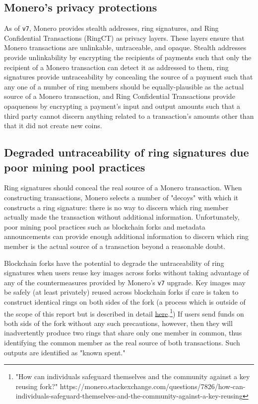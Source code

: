\documentclass[notitlepage]{report}
\begin{document}
\subsection{Monero's privacy protections}

As of \verb/v7/, Monero provides stealth addresses, ring signatures, and Ring Confidential Transactions (RingCT) as privacy layers.  These layers ensure that Monero transactions are unlinkable, untraceable, and opaque.  Stealth addresses provide unlinkability by encrypting the recipients of payments such that only the recipient of a Monero transaction can detect it as addressed to them, ring signatures provide untraceability by concealing the source of a payment such that any one of a number of ring members should be equally-plausible as the actual source of a Monero transaction, and Ring Confidential Transactions provide opaqueness by encrypting a payment's input and output amounts such that a third party cannot discern anything related to a transaction's amounts other than that it did not create new coins.

\subsection{Degraded untraceability of ring signatures due poor mining pool practices}

Ring signatures should conceal the real source of a Monero transaction.  When constructing transactions, Monero selects a number of "decoys" with which it constructs a ring signature: there is no way to discern which ring member actually made the transaction without additional information.  Unfortunately, poor mining pool practices such as blockchain forks and metadata announcements can provide enough additional information to discern which ring member is the actual source of a transaction beyond a reasonable doubt.

Blockchain forks have the potential to degrade the untraceability of ring signatures when users reuse key images across forks without taking advantage of any of the countermeasures provided by Monero's \verb/v7/ upgrade.  Key images may be safely (at least privately) reused across blockchain forks if care is taken to construct identical rings on both sides of the fork (a process which is outside of the scope of this report but is described in detail \href{https://monero.stackexchange.com/questions/7826/how-can-individuals-safeguard-themselves-and-the-community-against-a-key-reusing}{here}.\footnote{"How can individuals safeguard themselves and the community against a key reusing fork?" https://monero.stackexchange.com/questions/7826/how-can-individuals-safeguard-themselves-and-the-community-against-a-key-reusing})  If users send funds on both sids of the fork without any such precautions, however, then they will inadvertently produce two rings that share only one member in common, thus identifying the common member as the real source of both transactions.  Such outputs are identified as "known spent."
\end{document}
